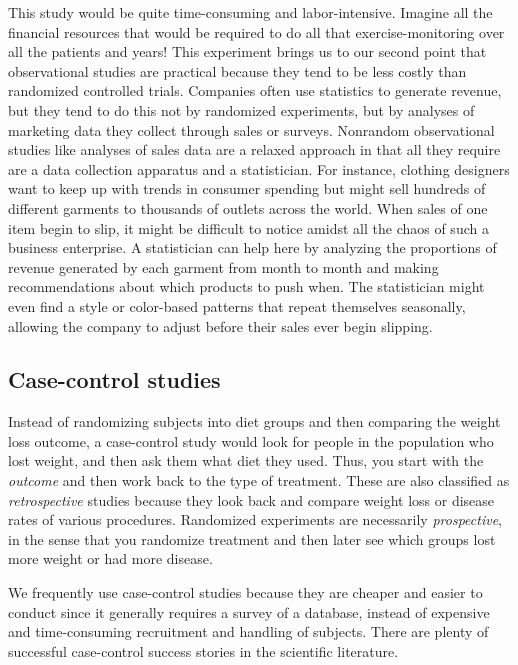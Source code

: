 \documentclass[11pt]{book}\usepackage[]{graphicx}\usepackage[]{color}
\begin{document}
This study would be quite time-consuming and labor-intensive. Imagine all the financial resources that would be required to do all that exercise-monitoring over all the patients and years! This experiment brings us to our second point that observational studies are practical because they tend to be less costly than randomized controlled trials. Companies often use statistics to generate revenue, but they tend to do this not by randomized experiments, but by analyses of marketing data they collect through sales or surveys. Nonrandom observational studies like analyses of sales data are a relaxed approach in that all they require are a data collection apparatus and a statistician. For instance, clothing designers want to keep up with trends in consumer spending but might sell hundreds of different garments to thousands of outlets across the world. When sales of one item begin to slip, it might be difficult to notice amidst all the chaos of such a business enterprise. A statistician can help here by analyzing the proportions of revenue generated by each garment from month to month and making recommendations about which products to push when. The statistician might even find a style or color-based patterns that repeat themselves seasonally, allowing the company to adjust before their sales ever begin slipping.

\subsection{Case-control studies}

Instead of randomizing subjects into diet groups and then comparing the weight loss outcome, a case-control study would look for people in the population who lost weight, and then ask them what diet they used.  Thus, you start with the \textit{outcome} and then work back to the type of treatment.  These are also classified as \textit{retrospective} studies because they look back and compare weight loss or disease rates of various procedures.  Randomized experiments are necessarily \textit{prospective}, in the sense that you randomize treatment and then later see which groups lost more weight or had more disease.

We frequently use case-control studies because they are cheaper and easier to conduct since it generally requires a survey of a database, instead of expensive and time-consuming recruitment and handling of subjects.  There are plenty of successful case-control success stories in the scientific literature.
\end{document}
